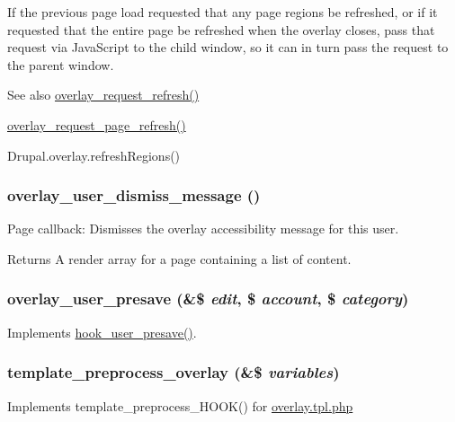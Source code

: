If the previous page load requested that any page regions be refreshed, or if it requested that the entire page be refreshed when the overlay closes, pass that request via JavaScript to the child window, so it can in turn pass the request to the parent window.

\begin{DoxySeeAlso}{See also}
\hyperlink{overlay_8module_aed708a9891795f894ceaba04627c752c}{overlay\_\-request\_\-refresh()} 

\hyperlink{overlay_8module_a4b08054849bbe3885aa4d8bb7479012e}{overlay\_\-request\_\-page\_\-refresh()} 

Drupal.overlay.refreshRegions() 
\end{DoxySeeAlso}
\hypertarget{overlay_8module_a82316c3dbea636c39a2cc05c630a0fa4}{
\subsubsection[{overlay\_\-user\_\-dismiss\_\-message}]{\setlength{\rightskip}{0pt plus 5cm}overlay\_\-user\_\-dismiss\_\-message ()}}
\label{overlay_8module_a82316c3dbea636c39a2cc05c630a0fa4}
Page callback: Dismisses the overlay accessibility message for this user.

\begin{DoxyReturn}{Returns}
A render array for a page containing a list of content. 
\end{DoxyReturn}
\hypertarget{overlay_8module_adb8ac54c44a2606a1153ab15860fc343}{
\subsubsection[{overlay\_\-user\_\-presave}]{\setlength{\rightskip}{0pt plus 5cm}overlay\_\-user\_\-presave (\&\$ {\em edit}, \/  \$ {\em account}, \/  \$ {\em category})}}
\label{overlay_8module_adb8ac54c44a2606a1153ab15860fc343}
Implements \hyperlink{group__hooks_gab6b224c35d7d97259d4350a7849f1e56}{hook\_\-user\_\-presave()}. \hypertarget{overlay_8module_a490f0cf3842ad8381b483be8ec42a153}{
\subsubsection[{template\_\-preprocess\_\-overlay}]{\setlength{\rightskip}{0pt plus 5cm}template\_\-preprocess\_\-overlay (\&\$ {\em variables})}}
\label{overlay_8module_a490f0cf3842ad8381b483be8ec42a153}
Implements template\_\-preprocess\_\-HOOK() for \hyperlink{overlay_8tpl_8php}{overlay.tpl.php}

